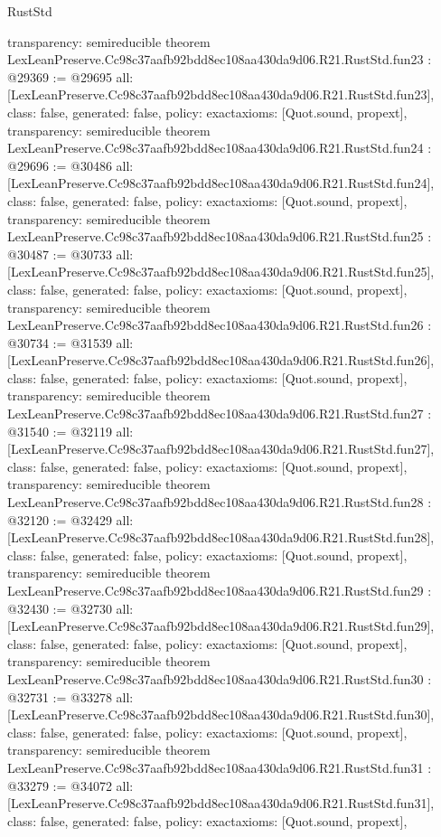 \begin{lexlean}{RustStd}
\begin{coremodule}
{  transparency: semireducible
}
theorem LexLeanPreserve.Cc98c37aafb92bdd8ec108aa430da9d06.R21.RustStd.fun23 : @29369 := @29695 {
  all: [LexLeanPreserve.Cc98c37aafb92bdd8ec108aa430da9d06.R21.RustStd.fun23],
  class: false,
  generated: false,
  policy: exact{axioms: [Quot.sound, propext]},
  transparency: semireducible
}
theorem LexLeanPreserve.Cc98c37aafb92bdd8ec108aa430da9d06.R21.RustStd.fun24 : @29696 := @30486 {
  all: [LexLeanPreserve.Cc98c37aafb92bdd8ec108aa430da9d06.R21.RustStd.fun24],
  class: false,
  generated: false,
  policy: exact{axioms: [Quot.sound, propext]},
  transparency: semireducible
}
theorem LexLeanPreserve.Cc98c37aafb92bdd8ec108aa430da9d06.R21.RustStd.fun25 : @30487 := @30733 {
  all: [LexLeanPreserve.Cc98c37aafb92bdd8ec108aa430da9d06.R21.RustStd.fun25],
  class: false,
  generated: false,
  policy: exact{axioms: [Quot.sound, propext]},
  transparency: semireducible
}
theorem LexLeanPreserve.Cc98c37aafb92bdd8ec108aa430da9d06.R21.RustStd.fun26 : @30734 := @31539 {
  all: [LexLeanPreserve.Cc98c37aafb92bdd8ec108aa430da9d06.R21.RustStd.fun26],
  class: false,
  generated: false,
  policy: exact{axioms: [Quot.sound, propext]},
  transparency: semireducible
}
theorem LexLeanPreserve.Cc98c37aafb92bdd8ec108aa430da9d06.R21.RustStd.fun27 : @31540 := @32119 {
  all: [LexLeanPreserve.Cc98c37aafb92bdd8ec108aa430da9d06.R21.RustStd.fun27],
  class: false,
  generated: false,
  policy: exact{axioms: [Quot.sound, propext]},
  transparency: semireducible
}
theorem LexLeanPreserve.Cc98c37aafb92bdd8ec108aa430da9d06.R21.RustStd.fun28 : @32120 := @32429 {
  all: [LexLeanPreserve.Cc98c37aafb92bdd8ec108aa430da9d06.R21.RustStd.fun28],
  class: false,
  generated: false,
  policy: exact{axioms: [Quot.sound, propext]},
  transparency: semireducible
}
theorem LexLeanPreserve.Cc98c37aafb92bdd8ec108aa430da9d06.R21.RustStd.fun29 : @32430 := @32730 {
  all: [LexLeanPreserve.Cc98c37aafb92bdd8ec108aa430da9d06.R21.RustStd.fun29],
  class: false,
  generated: false,
  policy: exact{axioms: [Quot.sound, propext]},
  transparency: semireducible
}
theorem LexLeanPreserve.Cc98c37aafb92bdd8ec108aa430da9d06.R21.RustStd.fun30 : @32731 := @33278 {
  all: [LexLeanPreserve.Cc98c37aafb92bdd8ec108aa430da9d06.R21.RustStd.fun30],
  class: false,
  generated: false,
  policy: exact{axioms: [Quot.sound, propext]},
  transparency: semireducible
}
theorem LexLeanPreserve.Cc98c37aafb92bdd8ec108aa430da9d06.R21.RustStd.fun31 : @33279 := @34072 {
  all: [LexLeanPreserve.Cc98c37aafb92bdd8ec108aa430da9d06.R21.RustStd.fun31],
  class: false,
  generated: false,
  policy: exact{axioms: [Quot.sound, propext]},
}
\end{coremodule}
\end{lexlean}
